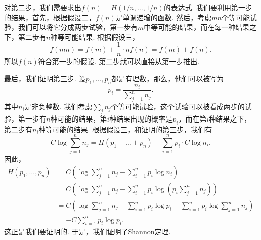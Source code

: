 对第二步，我们需要求出$f(n)=H(1/n,\dots,1/n)$的表达式. 我们要利用第一步的结果，首先，根据假设二，$f(n)$是单调递增的函数. 然后，考虑$mn$个等可能试验，我们可以将它分成两步试验，第一步有$m$中等可能的结果，而在每一种结果之下，第二步有$n$种等可能结果. 根据假设三，
\[
f(mn)=f(m)+\frac{1}{n}\cdot nf(n)=f(m)+f(n).    
\]
所以$f(n)$符合第一步的假设. 第二步就可以直接从第一步推出.

最后，我们证明第三步. 设$p_1,\dots,p_n$都是有理数，那么，他们可以被写为
\[
    p_i=\frac{n_i}{\sum_{j=1}^n n_j}.
\]
其中$n_i$是非负整数. 我们考虑$\sum_j n_j$个等可能试验，这个试验可以被看成两步的试验，第一步有$n$种可能的结果，第$i$种结果出现的概率是$p_i$，而在第$i$种结果之下，第二步有$n_i$种等可能的结果. 根据假设三，和证明的第三步，我们有
\[
   C\log\sum_{j=1}^nn_j=H(p_1+\dots+p_n)+\sum_{i=1}^n p_i\cdot C\log n_i.
\]
因此，
\begin{align*}
    H(p_1,\dots,p_n)&=C\left(\log\sum_{j=1}^nn_j-\sum_{i=1}^n p_i\log n_i\right)\\
    &=C\left(\log\sum_{j=1}^nn_j-\sum_{i=1}^n p_i\log\left(p_i\sum_{j=1}^n n_j\right)\right)\\
    &=C\left(\log\sum_{j=1}^nn_j-\sum_{i=1}^n p_i\log p_i-\sum_{i=1}^n p_i\log\sum_{j=1}^n n_j\right)\\
    &=-C\sum_{i=1}^n p_i\log p_i.
\end{align*}
这正是我们要证明的. 于是，我们证明了Shannon定理.

